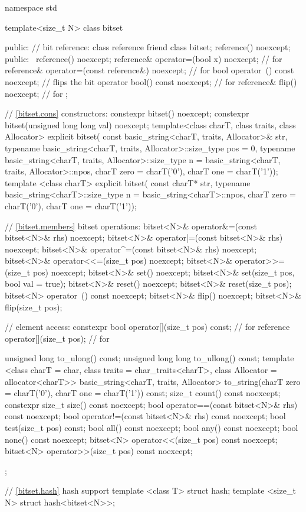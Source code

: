 \begin{codeblock}
namespace std {
  template<size_t N> class bitset {
  public:
    // bit reference:
    class reference {
      friend class bitset;
      reference() noexcept;
    public:
     ~reference() noexcept;
      reference& operator=(bool x) noexcept;             // for 
      reference& operator=(const reference&) noexcept;   // for 
      bool operator~() const noexcept;                   // flips the bit
      operator bool() const noexcept;                    // for 
      reference& flip() noexcept;                        // for 
    };

    // \ref{bitset.cons} constructors:
    constexpr bitset() noexcept;
    constexpr bitset(unsigned long long val) noexcept;
    template<class charT, class traits, class Allocator>
      explicit bitset(
        const basic_string<charT, traits, Allocator>& str,
        typename basic_string<charT, traits, Allocator>::size_type pos = 0,
        typename basic_string<charT, traits, Allocator>::size_type n =
          basic_string<charT, traits, Allocator>::npos,
          charT zero = charT('0'), charT one = charT('1'));
    template <class charT>
      explicit bitset(
        const charT* str,
        typename basic_string<charT>::size_type n = basic_string<charT>::npos,
        charT zero = charT('0'), charT one = charT('1'));

    // \ref{bitset.members} bitset operations:
    bitset<N>& operator&=(const bitset<N>& rhs) noexcept;
    bitset<N>& operator|=(const bitset<N>& rhs) noexcept;
    bitset<N>& operator^=(const bitset<N>& rhs) noexcept;
    bitset<N>& operator<<=(size_t pos) noexcept;
    bitset<N>& operator>>=(size_t pos) noexcept;
    bitset<N>& set() noexcept;
    bitset<N>& set(size_t pos, bool val = true);
    bitset<N>& reset() noexcept;
    bitset<N>& reset(size_t pos);
    bitset<N>  operator~() const noexcept;
    bitset<N>& flip() noexcept;
    bitset<N>& flip(size_t pos);

    // element access:
    constexpr bool operator[](size_t pos) const;       // for 
    reference operator[](size_t pos);                  // for 

    unsigned long to_ulong() const;
    unsigned long long to_ullong() const;
    template <class charT = char,
        class traits = char_traits<charT>,
        class Allocator = allocator<charT>>
      basic_string<charT, traits, Allocator>
      to_string(charT zero = charT('0'), charT one = charT('1')) const;
    size_t count() const noexcept;
    constexpr size_t size() const noexcept;
    bool operator==(const bitset<N>& rhs) const noexcept;
    bool operator!=(const bitset<N>& rhs) const noexcept;
    bool test(size_t pos) const;
    bool all() const noexcept;
    bool any() const noexcept;
    bool none() const noexcept;
    bitset<N> operator<<(size_t pos) const noexcept;
    bitset<N> operator>>(size_t pos) const noexcept;
  };

  // \ref{bitset.hash} hash support
  template <class T> struct hash;
  template <size_t N> struct hash<bitset<N>>;
}
\end{codeblock}

